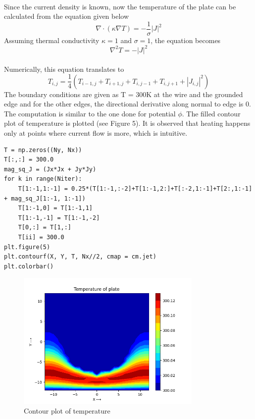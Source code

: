 \documentclass[12pt, a4paper]{article}
\begin{document}
\paragraph*{}
Since the current density is known, now the temperature of the plate can be calculated from the equation given below
\begin{equation*}
\nabla \cdot (\kappa \nabla T) = -\frac{1}{\sigma} |J|^2
\end{equation*}
Assuming thermal conductivity $\kappa = 1$ and $\sigma = 1$, the equation becomes
\begin{equation*}
\nabla^2 T = -|J|^2
\end{equation*}

\paragraph*{}
Numerically, this equation translates to
\begin{equation*}
T_{i,j} = \frac{1}{4} (T_{i-1,j} + T_{i+1,j} + T_{i,j-1} + T_{i,j+1} + |J_{i,j}|^2)
\end{equation*}
The boundary conditions are given as T = 300K at the wire and the grounded edge and for the other edges, the directional derivative along normal to edge is 0. The computation is similar to the one done for potential $\phi$. The filled contour plot of temperature is plotted (see Figure 5). It is observed that heating happens only at points where current flow is more, which is intuitive.

\begin{lstlisting}
T = np.zeros((Ny, Nx))
T[:,:] = 300.0
mag_sq_J = (Jx*Jx + Jy*Jy)
for k in range(Niter):
    T[1:-1,1:-1] = 0.25*(T[1:-1,:-2]+T[1:-1,2:]+T[:-2,1:-1]+T[2:,1:-1] + mag_sq_J[1:-1, 1:-1])
    T[1:-1,0] = T[1:-1,1]
    T[1:-1,-1] = T[1:-1,-2]
    T[0,:] = T[1,:]
    T[ii] = 300.0
plt.figure(5)
plt.contourf(X, Y, T, Nx//2, cmap = cm.jet)
plt.colorbar()
\end{lstlisting}

\begin{figure}
\centering
\includegraphics[width=0.8\textwidth]{Figure_5.png}
\caption{Contour plot of temperature}
\end{figure}
\end{document}
